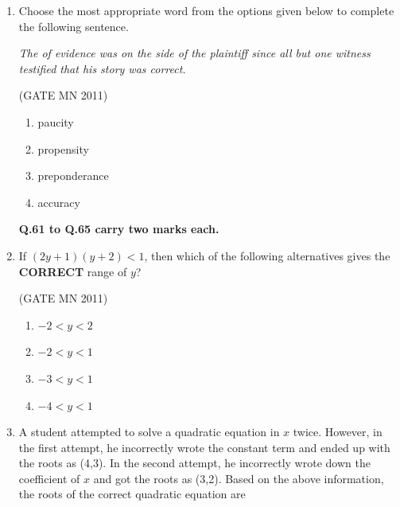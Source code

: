 \documentclass[journal]{IEEEtran}
\begin{document}
\begin{enumerate}
	\hfill(GATE MN 2011)
\begin{multicols}{4}
\begin{enumerate}
\item 4
\item 12
\item 64
\item 81
\end{enumerate}
\end{multicols}

\item Choose the most appropriate word from the options given below to complete the following sentence.  

\textit{The \underline{\hspace{2cm}} of evidence was on the side of the plaintiff since all but one witness testified that his story was correct.}


\hfill(GATE MN 2011)
\begin{enumerate}
\item paucity
\item propensity
\item preponderance
\item accuracy
\end{enumerate}


\textbf{Q.61 to Q.65 carry two marks each.}



\item If $(2y+1)(y+2) < 1$, then which of the following alternatives gives the \textbf{CORRECT} range of $y$?

	\hfill(GATE MN 2011)

\begin{multicols}{4}
\begin{enumerate}
\item $-2 < y < 2$
\item $-2 < y < 1$
\item $-3 < y < 1$
\item $-4 < y < 1$
\end{enumerate}
\end{multicols}

\item A student attempted to solve a quadratic equation in $x$ twice. However, in the first attempt, he incorrectly wrote the constant term and ended up with the roots as (4,3). In the second attempt, he incorrectly wrote down the coefficient of $x$ and got the roots as (3,2). Based on the above information, the roots of the correct quadratic equation are  


\end{enumerate}
\end{document}
